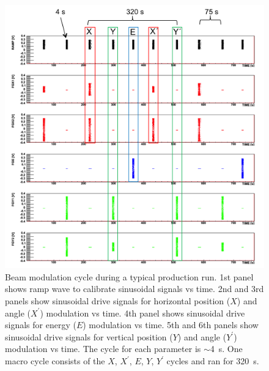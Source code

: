 \begin{singlespace}
\begin{figure}[!h]
	\begin{center}
	\includegraphics[width=15.0cm]{figures/BModCycle}
	\end{center}
	\caption
	{Beam modulation cycle during a typical production run. 1st panel shows ramp wave to calibrate sinusoidal signals vs time. 2nd and 3rd panels show sinusoidal drive signals for horizontal position ($X$) and angle ($X^{\prime}$) modulation vs time. 4th panel shows sinusoidal drive signals for energy ($E$) modulation vs time. 5th and 6th panels show sinusoidal drive signals for vertical position ($Y$) and angle ($Y^{\prime}$) modulation vs time. The cycle for each parameter is $\sim$4~s. One macro cycle consists of the $X$, $X^{\prime}$, $E$, $Y$, $Y^{\prime}$ cycles and ran for 320~s.}
	\label{fig:BModCycle}
\end{figure}
\end{singlespace}

